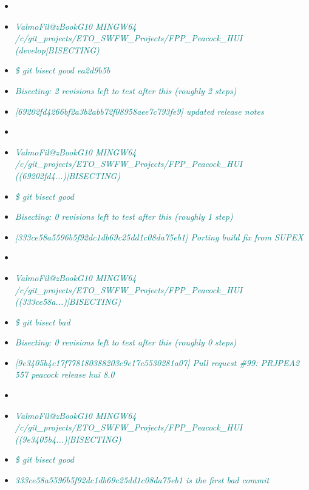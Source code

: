 \documentclass[a4paper,portrait,10pt]{article}   %
\newcommand{\mytextfilecolor}{teal}   %
\newcommand{\myexfont}{\small}   %
\begin{document}
\begin{itemize}
\begin{itemize}
  \item[]
  \item[] \textcolor{\mytextfilecolor}{\textit{\myexfont ValmoFil@zBookG10 MINGW64 /c/git\_projects/ETO\_SWFW\_Projects/FPP\_Peacock\_HUI (develop|BISECTING)}}
  \item[] \textcolor{\mytextfilecolor}{\textit{\myexfont \$ git bisect good ea2d9b5b}}
  \item[] \textcolor{\mytextfilecolor}{\textit{\myexfont Bisecting: 2 revisions left to test after this (roughly 2 steps)}}
  \item[] \textcolor{\mytextfilecolor}{\textit{\myexfont [69202fd4266bf2a3b2abb72f08958aee7c793fe9] updated release notes}}
  \item[]
  \item[] \textcolor{\mytextfilecolor}{\textit{\myexfont ValmoFil@zBookG10 MINGW64 /c/git\_projects/ETO\_SWFW\_Projects/FPP\_Peacock\_HUI ((69202fd4...)|BISECTING)}}
  \item[] \textcolor{\mytextfilecolor}{\textit{\myexfont \$ git bisect good}}
  \item[] \textcolor{\mytextfilecolor}{\textit{\myexfont Bisecting: 0 revisions left to test after this (roughly 1 step)}}
  \item[] \textcolor{\mytextfilecolor}{\textit{\myexfont [333ce58a5596b5f92dc1db69c25dd1c08da75eb1] Porting build fix from SUPEX}}
  \item[]
  \item[] \textcolor{\mytextfilecolor}{\textit{\myexfont ValmoFil@zBookG10 MINGW64 /c/git\_projects/ETO\_SWFW\_Projects/FPP\_Peacock\_HUI ((333ce58a...)|BISECTING)}}
  \item[] \textcolor{\mytextfilecolor}{\textit{\myexfont \$ git bisect bad}}
  \item[] \textcolor{\mytextfilecolor}{\textit{\myexfont Bisecting: 0 revisions left to test after this (roughly 0 steps)}}
  \item[] \textcolor{\mytextfilecolor}{\textit{\myexfont [9e3405b4c17f778180388203c9e17c5530281a07] Pull request \#99: PRJPEA2 557 peacock release hui 8.0}}
  \item[]
  \item[] \textcolor{\mytextfilecolor}{\textit{\myexfont ValmoFil@zBookG10 MINGW64 /c/git\_projects/ETO\_SWFW\_Projects/FPP\_Peacock\_HUI ((9e3405b4...)|BISECTING)}}
  \item[] \textcolor{\mytextfilecolor}{\textit{\myexfont \$ git bisect good}}
  \item[] \textcolor{\mytextfilecolor}{\textit{\myexfont 333ce58a5596b5f92dc1db69c25dd1c08da75eb1 is the first bad commit}}

\end{itemize}
\end{itemize}
\end{document}
